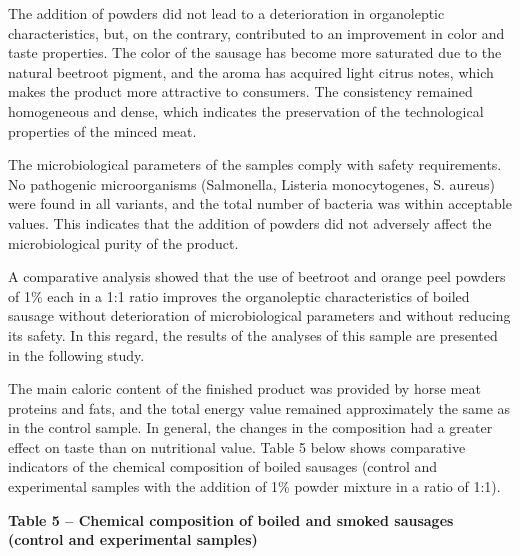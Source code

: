 \begin{multicols}{2}
The addition of powders did not lead to a deterioration in organoleptic
characteristics, but, on the contrary, contributed to an improvement in
color and taste properties. The color of the sausage has become more
saturated due to the natural beetroot pigment, and the aroma has
acquired light citrus notes, which makes the product more attractive to
consumers. The consistency remained homogeneous and dense, which
indicates the preservation of the technological properties of the minced
meat.

The microbiological parameters of the samples comply with safety
requirements. No pathogenic microorganisms (Salmonella, Listeria
monocytogenes, S. aureus) were found in all variants, and the total
number of bacteria was within acceptable values. This indicates that the
addition of powders did not adversely affect the microbiological purity
of the product.

A comparative analysis showed that the use of beetroot and orange peel
powders of 1\% each in a 1:1 ratio improves the organoleptic
characteristics of boiled sausage without deterioration of
microbiological parameters and without reducing its safety. In this
regard, the results of the analyses of this sample are presented in the
following study.

The main caloric content of the finished product was provided by horse
meat proteins and fats, and the total energy value remained
approximately the same as in the control sample. In general, the changes
in the composition had a greater effect on taste than on nutritional
value. Table 5 below shows comparative indicators of the chemical
composition of boiled sausages (control and experimental samples with
the addition of 1\% powder mixture in a ratio of 1:1).
\end{multicols}

{\bfseries Table 5 -- Chemical composition of boiled and smoked sausages
(control and experimental samples)}

